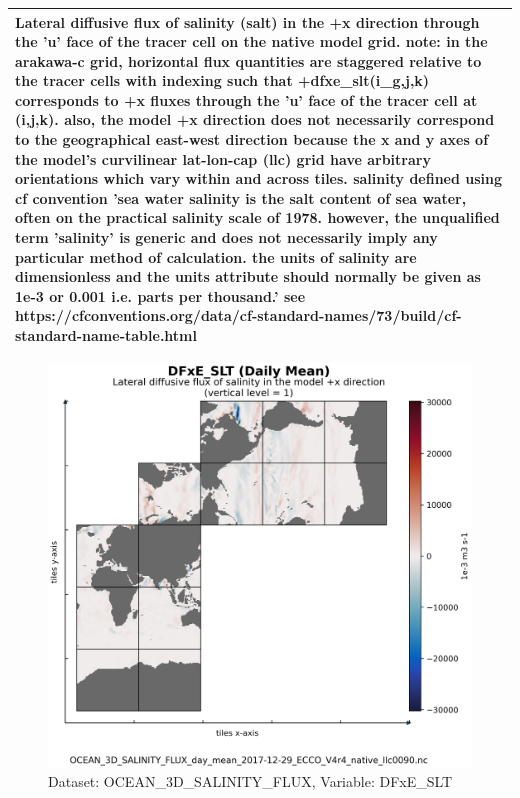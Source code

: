 \begin{longtable}{|m{}|m{}|m{}|m{}|}
\multicolumn{4}{|p{1\textwidth}|}{\footnotesize{{Lateral diffusive flux of salinity (salt) in the +x direction through the 'u' face of the tracer cell on the native model grid. note: in the arakawa-c grid, horizontal flux quantities are staggered relative to the tracer cells with indexing such that +dfxe\_slt(i\_g,j,k) corresponds to +x fluxes through the 'u' face of the tracer cell at (i,j,k). also, the model +x direction does not necessarily correspond to the geographical east-west direction because the x and y axes of the model's curvilinear lat-lon-cap (llc) grid have arbitrary orientations which vary within and across tiles. salinity defined using cf convention 'sea water salinity is the salt content of sea water, often on the practical salinity scale of 1978. however, the unqualified term 'salinity' is generic and does not necessarily imply any particular method of calculation. the units of salinity are dimensionless and the units attribute should normally be given as 1e-3 or 0.001 i.e. parts per thousand.' see https://cfconventions.org/data/cf-standard-names/73/build/cf-standard-name-table.html}}} \\ \hline
\end{longtable}

\begin{figure}[H]
\centering
\includegraphics[scale=0.55]{../images/plots/native_plots/Ocean_Three-Dimensional_Salinity_Fluxes/DFxE_SLT.png}
\caption{Dataset: OCEAN\_3D\_SALINITY\_FLUX, Variable: DFxE\_SLT}
\label{tab:table-OCEAN_3D_SALINITY_FLUX_DFxE_SLT-Plot}
\end{figure}
\newpage
\pagebreak
